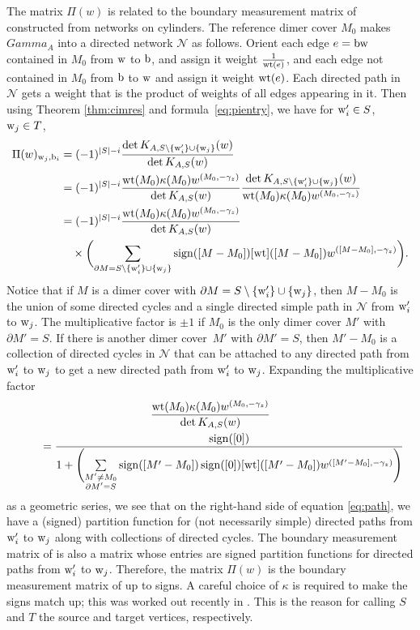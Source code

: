 \documentclass[10pt,a4paper]{amsart}
\numberwithin{equation}{section}
\newcommand{\A}{{\mathbb A}}
\newcommand{\la}{\label}
\newcommand{\w}{{\rm w}}
\newcommand{\bw}{{\rm b}}
\newcommand{\wt}{{\rm wt}}
\def\A{A}
\def\Gamma{Gamma}
\begin{document}
	\begin{Remark}
		\label{rem:bmm}
		The matrix $\Pi(w)$ is related to the boundary measurement matrix of \cite{GSTV} constructed from networks on cylinders.
		The reference dimer cover $M_0$ makes $\Gamma_\A$ into a directed network $\mathcal N$ as follows. Orient each edge $e=\bw \w$ contained in $M_0$ from $\w$ to $\bw$, and assign it weight $\frac 1 {\wt(e)}$, and each edge not contained in $M_0$ from $\bw$ to $\w$ and assign it weight $\wt(e)$. Each directed path in $\mathcal N$ gets a weight that is the product of weights of all edges appearing in it. Then using Theorem \ref{thm:cimres} and formula~\eqref{eq:pientry}, we have for $\w'_i \in S$, $\w_j \in T$,
		\begin{align}
			\Pi(w)_{\w_j,\bw_i}&=(-1)^{|S|-i} \frac{ \det K_{\A,S \setminus \{ \w'_i \} \cup \{ \w_j \}}(w)}{ \det K_{\A,S}(w)}\nonumber\\
			&{}=(-1)^{|S|-i} \frac{\wt(M_0) \kappa(M_0) w^{(M_0,-\gamma_z)}}{ \det K_{\A,S}(w)} \frac{ \det K_{\A,S \setminus \{ \w'_i \} \cup \{ \w_j \}}(w)}{\wt(M_0) \kappa(M_0) w^{(M_0,-\gamma_z)}}\nonumber\\
			&{}=(-1)^{|S|-i} \frac{\wt(M_0) \kappa(M_0) w^{(M_0,-\gamma_z)}}{ \det K_{\A,S}(w)} \nonumber \\
			&\quad{} \times\biggl( \sum_{\partial M=S \setminus \{ \w'_i \}\cup \{\w_j\}} \operatorname{sign}([M-M_0]) [\wt]([M-M_0])w^{([M-M_0],-\gamma_z)}\biggr). \la{eq:path}
		\end{align}
		Notice that if $M$ is a dimer cover with $\partial M =S \setminus \{ \w'_i \}\cup \{\w_j\}$, then $M-M_0$ is the union of some directed cycles and a single directed simple path in $\mathcal N$ from $\w'_i$ to $\w_j$. The multiplicative factor is $\pm1$ if $M_0$ is the only dimer cover $M'$ with $\partial M'=S$. If there is another dimer cover~$M'$ with $\partial M'=S$, then $M'-M_0$ is a collection of directed cycles in $\mathcal N$ that can be attached to any directed path from $\w'_i$ to $\w_j$ to get a new directed path from $\w'_i$ to $\w_j$. Expanding the multiplicative factor
		\begin{gather*}
		\frac{\wt(M_0) \kappa(M_0) w^{(M_0,-\gamma_z)}}{ \det K_{\A,S}(w)}\\
\qquad{}=\frac{ \operatorname{sign}([0])}{ 1+\Biggl(\sum\limits_{\substack{M' \neq M_0 \\ \partial M'=S}} \operatorname{sign}([M'-M_0]) \operatorname{sign}([0]) [\wt]([M'-M_0])w^{([M'-M_0],-\gamma_z)}\Biggr)}
		\end{gather*}
		as a geometric series, we see that on the right-hand side of equation \eqref{eq:path}, we have a (signed) partition function for (not necessarily simple) directed paths from $\w'_i$ to $\w_j$ along with collections of directed cycles. The boundary measurement matrix of \cite{GSTV} is also a matrix whose entries are signed partition functions for directed paths from $\w'_i$ to $\w_j$. Therefore, the matrix $\Pi(w)$ is the boundary measurement matrix of \cite{GSTV} up to signs. A careful choice of $\kappa$ is required to make the signs match up; this was worked out recently in \cite{Izosimov1}. This is the reason for calling $S$ and $T$ the source and target vertices, respectively.
	\end{Remark}
	
\end{document}
